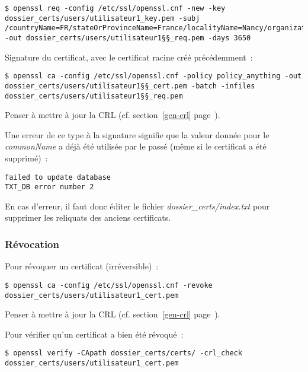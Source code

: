 \begin{lstlisting}
$ openssl req -config /etc/ssl/openssl.cnf -new -key dossier_certs/users/utilisateur1_key.pem -subj /countryName=FR/stateOrProvinceName=France/localityName=Nancy/organizationName=BHConsulting/commonName=utilisateur1/ -out dossier_certs/users/utilisateur1§§_req.pem -days 3650
\end{lstlisting}

Signature du certificat, avec le certificat racine créé précédemment~:

\begin{lstlisting}
$ openssl ca -config /etc/ssl/openssl.cnf -policy policy_anything -out dossier_certs/users/utilisateur1§§_cert.pem -batch -infiles dossier_certs/users/utilisateur1§§_req.pem
\end{lstlisting}

Penser à mettre à jour la CRL (cf. section~\ref{gen-crl} page~\pageref{gen-crl}).

Une erreur de ce type à la signature signifie que la valeur donnée pour le \emph{commonName} a déjà été utilisée par le passé (même si le certificat a été supprimé)~:

\begin{lstlisting}
failed to update database
TXT_DB error number 2
\end{lstlisting}

En cas d'erreur, il faut donc éditer le fichier \emph{dossier\_certs/index.txt} pour supprimer les reliquats des anciens certificats.

\subsubsection{Révocation}

Pour révoquer un certificat (irréversible)~: 

\begin{lstlisting}
$ openssl ca -config /etc/ssl/openssl.cnf -revoke dossier_certs/users/utilisateur1_cert.pem
\end{lstlisting}

Penser à mettre à jour la CRL (cf. section~\ref{gen-crl} page~\pageref{gen-crl}).

Pour vérifier qu'un certificat a bien été révoqué~:

\begin{lstlisting}
$ openssl verify -CApath dossier_certs/certs/ -crl_check dossier_certs/users/utilisateur1_cert.pem
\end{lstlisting}

